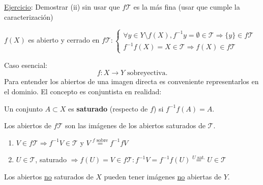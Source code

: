 \underline{Ejercicio}: Demostrar (ii) sin usar que $f\mathcal{T}$ es la más fina (usar que cumple la caracterización)

\begin{obs}
$f\left( X \right)$ es abierto y cerrado en $f\mathcal{T}: \begin{cases}
    \forall y \in Y \setminus f\left( X \right), f^{-1}y = \emptyset \in \mathcal{T} \Rightarrow \{y\} \in f\mathcal{T}\\
    f^{-1}f\left( X \right) = X \in \mathcal{T} \Rightarrow f\left( X \right) \in f\mathcal{T}
\end{cases}$
\end{obs}

Caso esencial:
\[
\boxed{f: X \rightarrow Y \text{ sobreyectiva}.} 
\]
Para entender los abiertos de una imagen directa es conveniente representarlos en el dominio. El concepto es conjuntista en realidad:


\begin{defi}
Un conjunto $A \subset X$ es \textbf{saturado} (respecto de $f$) si $f^{-1}f\left( A \right) = A$.
\end{defi}
\begin{prop}
Los abiertos de $f\mathcal{T}$ son las imágenes de los abiertos saturados de $\mathcal{T}$.    
\end{prop}
\begin{demo}
\begin{enumerate}
    \item $V \in f\mathcal{T} \Rightarrow f^{-1}V \in \mathcal{T}$ y $V \stackrel{f \text{ sobre}}{=} f^{-1}fV$
    \item $U \in \mathcal{T}$, saturado $\Rightarrow f\left( U \right) = V \in f\mathcal{T}: f^{-1}V = f^{-1}f\left( U \right) \stackrel{U \text{ sat.}}{=} U \in \mathcal{T}$
\end{enumerate}
\end{demo}

\begin{obs}
Los abiertos \underline{no} saturados de $X$ pueden tener imágenes \underline{no} abiertas de $Y$. 
\end{obs}

